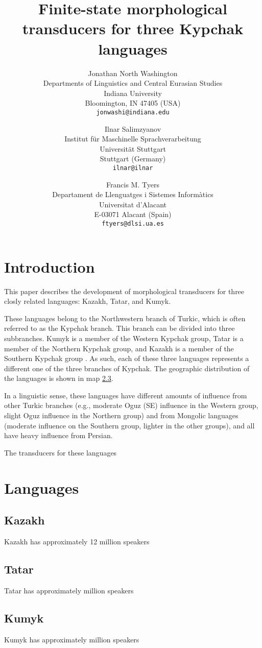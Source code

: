 \documentclass[a4paper,11pt,twocolumn]{article}
\title{Finite-state morphological transducers for three Kypchak languages}
\author{Jonathan North Washington \\
Departments of Linguistics and Central Eurasian Studies\\
Indiana University\\
Bloomington, IN 47405 (USA)\\
\texttt{jonwashi@indiana.edu} \and
Ilnar Salimzyanov  \\
Institut für Maschinelle Sprachverarbeitung \\
Universität Stuttgart\\
Stuttgart (Germany) \\
\texttt{ilnar@ilnar} \and 
Francis M. Tyers\\
Departament de Llenguatges i Sistemes Informàtics \\  
Universitat d'Alacant\\
E-03071 Alacant (Spain)\\
\texttt{ftyers@dlsi.ua.es} 
}
\begin{document}
\maketitleabstract{}

\section{Introduction}

This paper describes the development of morphological transducers for three closly related languages: Kazakh, Tatar, and Kumyk.

These languages belong to the Northwestern branch of Turkic, which is often referred to as the Kypchak branch.  This branch can be divided into three subbranches.  Kumyk is a member of the Western Kypchak group, Tatar is a member of the Northern Kypchak group, and Kazakh is a member of the Southern Kypchak group \citep[82-83]{histofturkic}.  As such, each of these three languages represents a different one of the three branches of Kypchak.  The geographic distribution of the languages is shown in map \ref{}.

In a linguistic sense, these languages have different amounts of influence from other Turkic branches (e.g., moderate Oguz (SE) influence in the Western group, slight Oguz influence in the Northern group) and from Mongolic languages (moderate influence on the Southern group, lighter in the other groups), and all have heavy influence from Persian.

\cite{washington2012}
\cite{salimzyanov2013}
\cite{bekmanova2013}

The transducers for these languages 

\section{Languages}

\subsection{Kazakh}
Kazakh has approximately 12 million speakers

\subsection{Tatar}
Tatar has approximately  million speakers

\subsection{Kumyk}
Kumyk has approximately  million speakers
\end{document}

